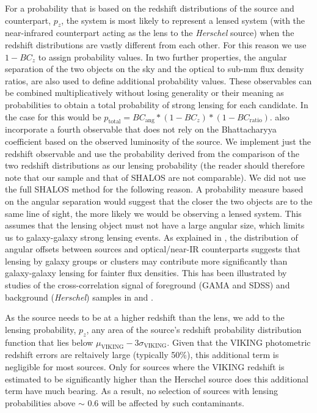 \documentclass[fleqn,usenatbib]{mnras}
\begin{document}
For a probability that is based on the redshift distributions of the source and counterpart, $p_z$, the system is most likely to represent a lensed system (with the near-infrared counterpart acting as the lens to the \textit{Herschel} source) when the redshift distributions are vastly different from each other. For this reason we use $1 - BC_z$ to assign probability values. In \citealt{GonzalezNuevo_2019} two further properties, the angular separation of the two objects on the sky and the optical to sub-mm flux density ratios, are also used to define additional probability values. These observables can be combined multiplicatively without losing generality or their meaning as probabilities to obtain a total probability of strong lensing for each candidate. In the case for \citealt{GonzalezNuevo_2019} this would be $p_{\textrm{total}} = BC_{\textrm{ang}} \ast (1 - BC_z) \ast (1 - BC_{\textrm{ratio}})$. \citealt{GonzalezNuevo_2019} also incorporate a fourth observable that does not rely on the Bhattacharyya coefficient based on the observed luminosity of the source. We implement just the redshift observable and use the probability derived from the comparison of the two redshift distributions as our lensing probability (the reader should therefore note that our sample and that of SHALOS are not comparable). We did not use the full SHALOS method for the following reason. A probability measure based on the angular separation would suggest that the closer the two objects are to the same line of sight, the more likely we would be observing a lensed system. This assumes that the lensing object must not have a large angular size, which limits us to galaxy-galaxy strong lensing events. As explained in \citealt{Bakx_2020}, the distribution of angular offsets between sources and optical/near-IR counterparts suggests that lensing by galaxy groups or clusters may contribute more significantly than galaxy-galaxy lensing for fainter flux densities. This has been illustrated by studies of the cross-correlation signal of foreground (GAMA and SDSS) and background (\textit{Herschel}) samples in \citealt{GonzalezNuevo_2014} and \citealt{GonzalezNuevo_2017}.

As the source needs to be at a higher redshift than the lens, we add to the lensing probability, $p_z$, any area of the source's redshift probability distribution function that lies below $\mu_{\textrm{VIKING}} - 3\sigma_{\textrm{VIKING}}$. Given that the VIKING photometric redshift errors are reltaively large (typically 50\%), this additional term is negligible for most sources. Only for sources where the VIKING redshift is estimated to be significantly higher than the Herschel source does this additional term have much bearing. As a result, no selection of sources with lensing probabilities above $\sim$ 0.6 will be affected by such contaminants. 
\end{document}
